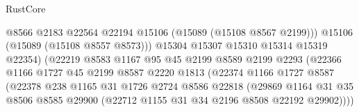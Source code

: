 \begin{lexlean}{RustCore}
\begin{coremodule}
                                            @8566
                                            @2183
                                            @22564
                                            @22194
                                            @15106
                                            (@15089 (@15108 @8567 @2199)))
                                          @15106
                                          (@15089 (@15108 @8557 @8573)))
                                        @15304
                                        @15307
                                        @15310
                                        @15314
                                        @15319
                                        @22354)
                                      (@22219
                                        @8583
                                        @1167
                                        @95
                                        @45
                                        @2199
                                        @8589
                                        @2199
                                        @2293
                                        (@22366
                                          @1166
                                          @1727
                                          @45
                                          @2199
                                          @8587
                                          @2220
                                          @1813
                                          (@22374
                                            @1166
                                            @1727
                                            @8587
                                            (@22378
                                              @238
                                              @1165
                                              @31
                                              @1726
                                              @2724
                                              @8586
                                              @22818
                                              (@29869
                                                @1164
                                                @31
                                                @35
                                                @8506
                                                @8585
                                                @29900
                                                (@22712 @1155 @31 @34 @2196 @8508 @22192 @29902))))

\end{coremodule}
\end{lexlean}
